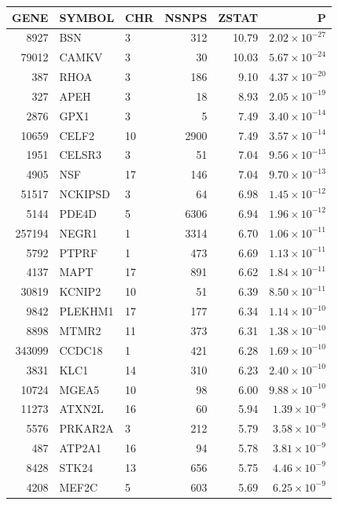 \begin{table}[ht]
\centering
\begin{tabular}{rllrrr}
  \hline
GENE & SYMBOL & CHR & NSNPS & ZSTAT & P \\ 
  \hline
8927 & BSN & 3 & 312 & 10.79 & $2.02 \times 10^{-27}$ \\ 
  79012 & CAMKV & 3 &  30 & 10.03 & $5.67 \times 10^{-24}$ \\ 
  387 & RHOA & 3 & 186 & 9.10 & $4.37 \times 10^{-20}$ \\ 
  327 & APEH & 3 &  18 & 8.93 & $2.05 \times 10^{-19}$ \\ 
  2876 & GPX1 & 3 &   5 & 7.49 & $3.40 \times 10^{-14}$ \\ 
  10659 & CELF2 & 10 & 2900 & 7.49 & $3.57 \times 10^{-14}$ \\ 
  1951 & CELSR3 & 3 &  51 & 7.04 & $9.56 \times 10^{-13}$ \\ 
  4905 & NSF & 17 & 146 & 7.04 & $9.70 \times 10^{-13}$ \\ 
  51517 & NCKIPSD & 3 &  64 & 6.98 & $1.45 \times 10^{-12}$ \\ 
  5144 & PDE4D & 5 & 6306 & 6.94 & $1.96 \times 10^{-12}$ \\ 
  257194 & NEGR1 & 1 & 3314 & 6.70 & $1.06 \times 10^{-11}$ \\ 
  5792 & PTPRF & 1 & 473 & 6.69 & $1.13 \times 10^{-11}$ \\ 
  4137 & MAPT & 17 & 891 & 6.62 & $1.84 \times 10^{-11}$ \\ 
  30819 & KCNIP2 & 10 &  51 & 6.39 & $8.50 \times 10^{-11}$ \\ 
  9842 & PLEKHM1 & 17 & 177 & 6.34 & $1.14 \times 10^{-10}$ \\ 
  8898 & MTMR2 & 11 & 373 & 6.31 & $1.38 \times 10^{-10}$ \\ 
  343099 & CCDC18 & 1 & 421 & 6.28 & $1.69 \times 10^{-10}$ \\ 
  3831 & KLC1 & 14 & 310 & 6.23 & $2.40 \times 10^{-10}$ \\ 
  10724 & MGEA5 & 10 &  98 & 6.00 & $9.88 \times 10^{-10}$ \\ 
  11273 & ATXN2L & 16 &  60 & 5.94 & $1.39 \times 10^{-9}$ \\ 
  5576 & PRKAR2A & 3 & 212 & 5.79 & $3.58 \times 10^{-9}$ \\ 
  487 & ATP2A1 & 16 &  94 & 5.78 & $3.81 \times 10^{-9}$ \\ 
  8428 & STK24 & 13 & 656 & 5.75 & $4.46 \times 10^{-9}$ \\ 
  4208 & MEF2C & 5 & 603 & 5.69 & $6.25 \times 10^{-9}$ \\ 

\end{tabular}
\end{table}
